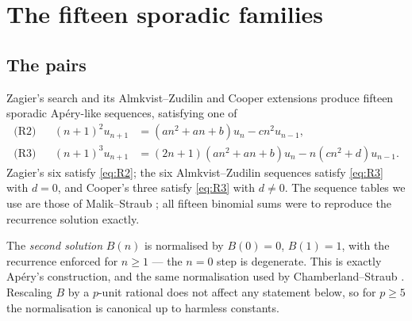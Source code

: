 \section{The fifteen sporadic families}
\label{sec:families}

\subsection{The pairs}

Zagier's search and its Almkvist--Zudilin and Cooper extensions produce fifteen sporadic
Ap\'ery-like sequences, satisfying one of
\begin{align}
  \text{(R2)}&& (n+1)^2u_{n+1}&=(an^2+an+b)u_n-cn^2u_{n-1}, \label{eq:R2}\\
  \text{(R3)}&& (n+1)^3u_{n+1}&=(2n+1)(an^2+an+b)u_n-n(cn^2+d)u_{n-1}. \label{eq:R3}
\end{align}
Zagier's six satisfy \eqref{eq:R2}; the six Almkvist--Zudilin sequences satisfy
\eqref{eq:R3} with $d=0$, and Cooper's three satisfy \eqref{eq:R3} with $d\ne0$. The
sequence tables we use are those of Malik--Straub \cite[Tables 1--2]{MalikStraub}; all
fifteen binomial sums were  to reproduce the recurrence solution
exactly.

The \emph{second solution} $B(n)$ is normalised by $B(0)=0$, $B(1)=1$, with the recurrence
enforced for $n\ge1$ --- the $n=0$ step is degenerate. This is exactly Ap\'ery's
construction, and the same normalisation used by Chamberland--Straub \cite{ChamStraub}.
Rescaling $B$ by a $p$-unit rational does not affect any statement below, so for $p\ge5$
the normalisation is canonical up to harmless constants.

